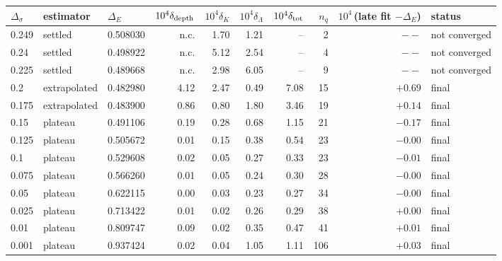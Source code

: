 \begin{tabular}{@{}lllrrrrrrl@{}}
\toprule
$\Delta_\sigma$ & estimator & $\Delta_E$ & $10^4\delta_{\rm depth}$ & $10^4\delta_K$ & $10^4\delta_\Lambda$ & $10^4\delta_{\rm tot}$ & $n_q$ & $10^4\,$(late fit $-\Delta_E$) & status\\
\midrule
0.249 & settled & 0.508030 & n.c. & 1.70 & 1.21 & -- & 2 & $--$ & not converged\\
0.24 & settled & 0.498922 & n.c. & 5.12 & 2.54 & -- & 4 & $--$ & not converged\\
0.225 & settled & 0.489668 & n.c. & 2.98 & 6.05 & -- & 9 & $--$ & not converged\\
0.2 & extrapolated & 0.482980 & 4.12 & 2.47 & 0.49 & 7.08 & 15 & $+0.69$ & final\\
0.175 & extrapolated & 0.483900 & 0.86 & 0.80 & 1.80 & 3.46 & 19 & $+0.14$ & final\\
0.15 & plateau & 0.491106 & 0.19 & 0.28 & 0.68 & 1.15 & 21 & $-0.17$ & final\\
0.125 & plateau & 0.505672 & 0.01 & 0.15 & 0.38 & 0.54 & 23 & $-0.00$ & final\\
0.1 & plateau & 0.529608 & 0.02 & 0.05 & 0.27 & 0.33 & 23 & $-0.01$ & final\\
0.075 & plateau & 0.566260 & 0.01 & 0.05 & 0.24 & 0.30 & 28 & $-0.00$ & final\\
0.05 & plateau & 0.622115 & 0.00 & 0.03 & 0.23 & 0.27 & 34 & $-0.00$ & final\\
0.025 & plateau & 0.713422 & 0.01 & 0.02 & 0.26 & 0.29 & 38 & $+0.00$ & final\\
0.01 & plateau & 0.809747 & 0.09 & 0.02 & 0.35 & 0.47 & 41 & $+0.01$ & final\\
0.001 & plateau & 0.937424 & 0.02 & 0.04 & 1.05 & 1.11 & 106 & $+0.03$ & final\\
\bottomrule
\end{tabular}
